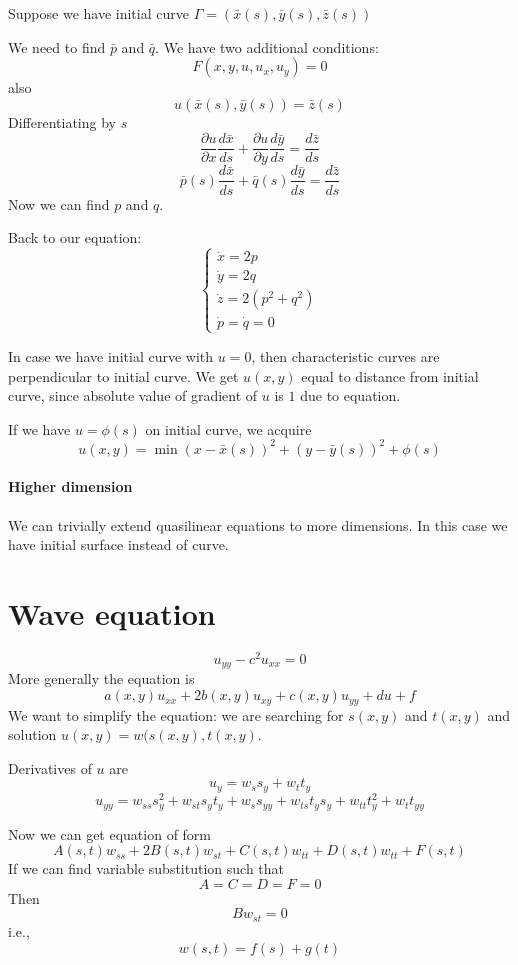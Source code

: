 Suppose we have initial curve $\Gamma = (\bar{x}(s), \bar{y}(s), \bar{z}(s))$

We need to find $\bar{p}$ and $\bar{q}$. We have two additional conditions:
$$F(x,y,u,u_x,u_y) = 0$$
also
$$u(\bar{x}(s), \bar{y}(s)) = \bar{z}(s)$$
Differentiating by $s$
$$\frac{\partial u}{\partial x}\frac{d\bar{x}}{ds} + \frac{\partial u}{\partial y}\frac{d\bar{y}}{ds} = \frac{d\bar{z}}{ds}$$
$$\bar{p}(s)\frac{d\bar{x}}{ds} + \bar{q}(s)\frac{d\bar{y}}{ds} = \frac{d\bar{z}}{ds}$$
Now we can find $p$ and $q$.

Back to our equation:
$$\begin{cases}
\dot{x} = 2p\\
\dot{y} = 2q\\
\dot{z} = 2(p^2+q^2)\\
\dot{p} = \dot{q} = 0
\end{cases}$$

In case we have initial curve with $u=0$, then characteristic curves are perpendicular to initial curve.  We get $u(x,y)$ equal to distance from initial curve, since absolute value of gradient of $u$ is $1$ due to equation.

If we have $u=\phi(s)$ on initial curve, we acquire
$$u(x,y) = \min (x-\bar{x}(s))^2 + (y-\bar{y}(s))^2 + \phi(s)$$

\paragraph{Higher dimension}
We can trivially extend quasilinear equations to more dimensions. In this case we have initial surface instead of curve.
\section{Wave equation}
$$u_{yy} -c^2u_{xx} = 0$$
More generally the equation is
$$a(x,y) u_{xx} + 2b(x,y) u_{xy} + c(x,y) u_{yy} + du + f$$
We want to simplify the equation: we are searching for $s(x,y)$ and $t(x,y)$ and solution $u(x,y) = w(s(x,y), t(x,y)$.

Derivatives of $u$ are
$$u_y = w_s s_y + w_tt_y$$
$$u_{yy} = w_{ss} s_{y}^2 + w_{st}s_yt_y + w_{s}s_{yy} + w_{ts}t_ys_y + w_{tt} t_{y}^2+ w_{t}t_{yy}  $$

Now we can get equation of form
$$A(s,t) w_{ss} + 2B(s,t) w_{st} + C(s,t) w_{tt} + D(s,t) w_{tt}+ F(s,t)$$
If we can find variable substitution such that
$$A=C=D=F=0$$
Then
$$Bw_{st} = 0$$
i.e.,
$$w(s,t) = f(s)+g(t)$$